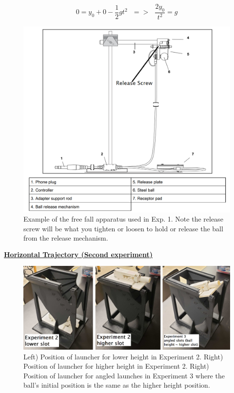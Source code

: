  \begin{equation}
  \label{eq:M03Kinematic_freefall_g}
  0 = y_{0} + 0 - \frac{1}{2}gt^{2}~~~=>~~~\frac{2y_{0}}{t^2} = g
\end{equation}

\begin{figure}[h]
  \begin{center}
    \includegraphics[width=4.9in]{Fall/Experiment03FiguresNEW/M3_Exp1.png}
  \end{center}
  \caption{Example of the free fall apparatus used in Exp. 1. Note the release screw will be what you tighten or loosen to hold or release the ball from the release mechanism.}
  \label{M03_simpleProjectileLauncher_Exp1}
\end{figure}

\pagebreak

\underline{\textbf{Horizontal Trajectory (Second experiment)}}


\begin{figure}[h]
  \begin{center}
    \includegraphics[width=5.9in]{Fall/Experiment03FiguresNEW/M3_ExpOptions_quarter_size.png}
  \end{center}
  \caption{Left) Position of launcher for lower height in Experiment 2. Right) Position of launcher for higher height in Experiment 2. Right) Position of launcher for angled launches in Experiment 3 where the ball's initial position is the same as the higher height position.}
  \label{M03_simpleProjectileLauncher}
\end{figure}


